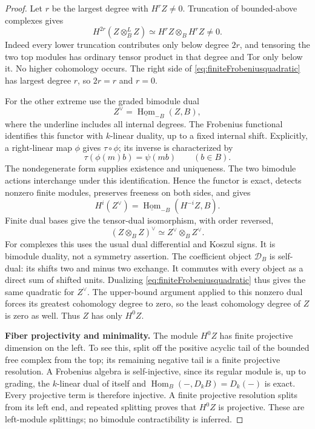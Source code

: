 \begin{proof}
Let \(r\) be the largest degree with \(H^rZ\ne0\).
Truncation of bounded-above complexes gives
\begin{equation}\label{eq:FrobeniusTopTensor}
 H^{2r}(Z\otimes_B^L Z)
       \simeq H^rZ\otimes_B H^rZ\ne0.
\end{equation}
Indeed every lower truncation contributes only below degree
\(2r\), and tensoring the two top modules has ordinary tensor
product in that degree and Tor only below it. No higher
cohomology occurs. The right side of
\eqref{eq:finiteFrobeniusquadratic} has largest degree \(r\),
so \(2r=r\) and \(r=0\).

For the other extreme use the graded bimodule dual
\[
 Z^\vee=\underline{\operatorname{Hom}}_{-B}(Z,B),
\]
where the underline includes all internal degrees. The
Frobenius functional identifies this functor with \(k\)-linear
duality, up to a fixed internal shift. Explicitly, a right-linear
map \(\phi\) gives \(\tau\circ\phi\); its inverse is
characterized by
\[
                  \tau(\phi(m)b)=\psi(mb)\qquad(b\in B).
\]
The nondegenerate form supplies existence and uniqueness.
The two bimodule actions interchange under this identification.
Hence the functor is exact, detects nonzero finite modules,
preserves freeness on both sides, and gives
\[
 H^i(Z^\vee)=
 \underline{\operatorname{Hom}}_{-B}(H^{-i}Z,B).
\]
Finite dual bases give the tensor-dual isomorphism, with order
reversed,
\[
             (Z\otimes_B Z)^\vee
                 \simeq Z^\vee\otimes_B Z^\vee.
\]
For complexes this uses the usual dual differential and Koszul
signs. It is bimodule duality, not a symmetry assertion.
The coefficient object \(\mathscr D_B\) is self-dual: its
shifts two and minus two exchange. It commutes with every object
as a direct sum of shifted units. Dualizing
\eqref{eq:finiteFrobeniusquadratic} thus gives the same
quadratic for \(Z^\vee\). The upper-bound argument applied to
this nonzero dual forces its greatest cohomology degree to zero,
so the least cohomology degree of \(Z\) is zero as well.
Thus \(Z\) has only \(H^0Z\).

\par\smallskip\noindent\textbf{Fiber projectivity and minimality.}\quad
The module \(H^0Z\) has finite projective dimension on the
left. To see this, split off the positive acyclic tail of the
bounded free complex from the top; its remaining negative tail
is a finite projective resolution. A Frobenius algebra is
self-injective, since its regular module is, up to grading,
the \(k\)-linear dual of itself and
\(\operatorname{Hom}_B(-,D_kB)=D_k(-)\) is exact.
Every projective term is therefore injective. A finite
projective resolution splits from its left end, and repeated
splitting proves that \(H^0Z\) is projective. These are
left-module splittings; no bimodule contractibility is inferred.


\end{proof}

